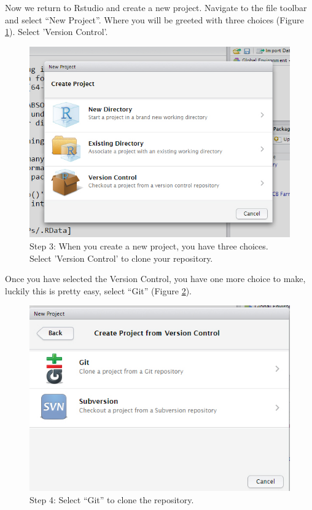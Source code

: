 \documentclass[12pt]{../SOP3_beta}
\begin{document}
\NP Now we return to Rstudio and create a new project. Navigate to the file toolbar and select ``New Project''. Where you will be greeted with three choices (Figure \ref{fig:step3}). Select 'Version Control'. 
\begin{figure}[H]
\includegraphics{graphics/RstudioNewProject.jpg}
\caption{Step 3: When you create a new project, you have three choices. Select 'Version Control' to clone your repository.}
\label{fig:step3}
\end{figure}

\NP Once you have selected the Version Control, you have one more choice to make, luckily this is pretty easy, select ``Git'' (Figure \ref{fig:step4}).

\begin{figure}[H]
\includegraphics{graphics/RstudioNewProject2.jpg}
\caption{Step 4: Select ``Git'' to clone the repository.}
\label{fig:step4}
\end{figure}
\end{document}
